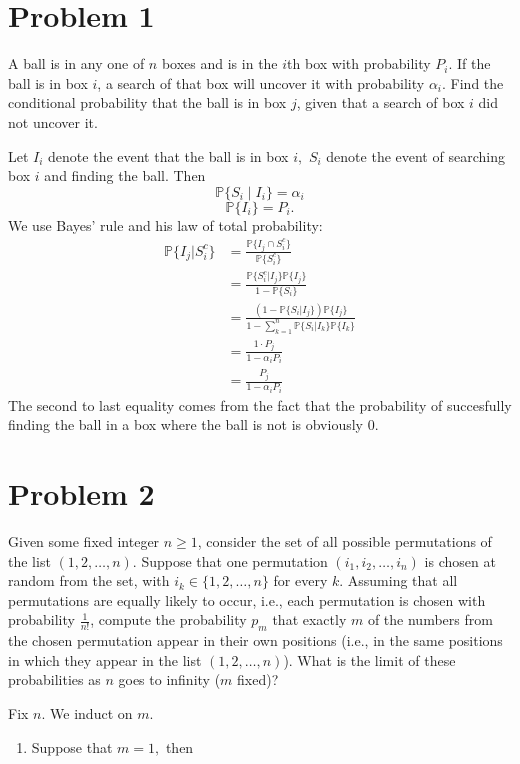 \documentclass[11pt]{article}
\newcommand{\bbP}{\mathbb{P}}
\begin{document}
	
	
	\psetheader

\section*{Problem 1}
\begin{problem}
    A ball is in any one of $n$ boxes and is in the $i$th box with probability $P_i$. If the ball is in box $i$, a search of that box will uncover it with probability $\alpha_i$. Find the conditional probability that the ball is in box $j$, given that a search of box $i$ did not uncover it.
\end{problem}
\begin{solution}
    Let $I_i$ denote the event that the ball is in box $i,$ $S_i$ denote the event of searching box $i$ and finding the ball. Then 
    \[\bbP\{S_i \mid I_i\} = \alpha_i\]
    \[\bbP\{I_i\} = P_i.\] We use Bayes' rule and his law of total probability:
    \begin{align*}
        \bbP\{I_j | S_i^c\} &= \frac{\bbP\{I_j \cap S_i^c\}}{\bbP\{S_i^c\}}\\
        &= \frac{\bbP\{S_i^c | I_j\}\bbP\{I_j\}}{1 - \bbP\{S_i\}}\\
        &= \frac{(1-\bbP\{S_i | I_j\})\bbP\{I_j\}}{1 - \sum_{k=1}^n\bbP\{S_i | I_k\}\bbP\{I_k\}}\\
        &= \frac{1 \cdot P_j}{1 - \alpha_iP_i}\\
        &= \frac{P_j}{1 - \alpha_iP_i}
    \end{align*}
    The second to last equality comes from the fact that the probability of succesfully finding the ball in a box where the ball is not is obviously $0.$
\end{solution}

\newpage
\section*{Problem 2}
\begin{problem}
    Given some fixed integer \( n \geq 1 \), consider the set of all possible permutations of the list \( (1, 2, \ldots, n) \). Suppose that one permutation \( (i_1, i_2, \ldots, i_n) \) is chosen at random from the set, with \( i_k \in \{1, 2, \ldots, n\} \) for every \( k \). Assuming that all permutations are equally likely to occur, i.e., each permutation is chosen with probability \( \frac{1}{n!} \), compute the probability \( p_m \) that exactly \( m \) of the numbers from the chosen permutation appear in their own positions (i.e., in the same positions in which they appear in the list \( (1, 2, \ldots, n) \)). What is the limit of these probabilities as \( n \) goes to infinity (\( m \) fixed)?
\end{problem}
\begin{solution}
    Fix $n.$ We induct on $m.$ 
    \begin{enumerate}
        \item Suppose that $m = 1,$ then 
        \[\]
    \end{enumerate}
\end{solution}
\end{document}
